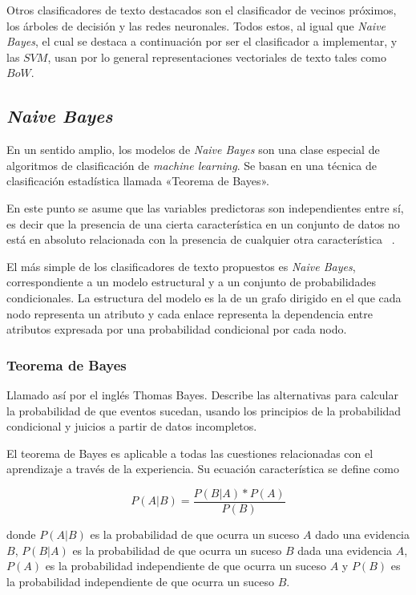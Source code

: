 \documentclass[sigconf]{acmart}
\begin{document}
Otros clasificadores de texto destacados son el clasificador de vecinos próximos, los árboles de decisión y las redes neuronales. Todos estos, al igual que {\itshape Naive Bayes}, el cual se destaca a continuación por ser el clasificador a implementar, y las $SVM$, usan por lo general representaciones vectoriales de texto tales como $BoW$.


\subsection{{\itshape Naive Bayes}}
En un sentido amplio, los modelos de {\itshape Naive Bayes} son una clase especial de algoritmos de clasificación de {\itshape machine learning}. Se basan en una técnica de clasificación estadística llamada «Teorema de Bayes».

En este punto se asume que las variables predictoras son independientes entre sí, es decir que la presencia de una cierta característica en un conjunto de datos no está en absoluto relacionada con la presencia de cualquier otra característica ~\cite{vRoman}.

El más simple de los clasificadores de texto propuestos es {\itshape Naive Bayes}, correspondiente a un modelo estructural y a un conjunto de probabilidades condicionales. La estructura del modelo es la de un grafo dirigido en el que cada nodo representa un atributo y cada enlace representa la dependencia entre atributos expresada por una probabilidad condicional por cada nodo.


\subsubsection{Teorema de Bayes} Llamado así por el inglés Thomas Bayes. Describe las alternativas para calcular la probabilidad de que eventos sucedan, usando los principios de la probabilidad condicional y juicios a partir de datos incompletos. 

El teorema de Bayes es aplicable a todas las cuestiones relacionadas con el aprendizaje a través de la experiencia. Su ecuación característica se define como

\begin{equation}
    P(A|B)=\frac{P(B|A) * P(A)}{P(B)}
\end{equation}

donde $P(A|B)$ es la probabilidad de que ocurra un suceso $A$ dado una evidencia $B$, $P(B|A)$ es la probabilidad de que ocurra un suceso $B$ dada una evidencia $A$, $P(A)$ es la probabilidad independiente de que ocurra un suceso $A$ y $P(B)$ es la probabilidad independiente de que ocurra un suceso $B$.
\end{document}
